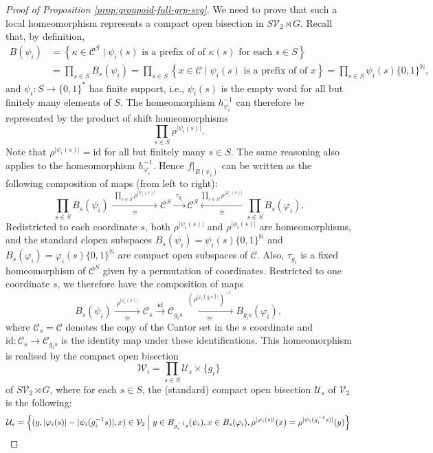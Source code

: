 \documentclass[10pt,a4paper]{amsart}
\numberwithin{equation}{section}
\numberwithin{figure}{section}
\theoremstyle{definition}
\newcommand{\cC}{\mathcal{C}}
\newcommand{\cU}{\mathcal{U}}
\newcommand{\cV}{\mathcal{V}}
\newcommand{\cW}{\mathcal{W}}
\newcommand{\bN}{\mathbb{N}}
\begin{document}
\begin{proof}[Proof of Proposition \ref{prop:groupoid-full-grp-svg}]
We need to prove that such a local homeomorphism represents a compact open bisection in $S\cV_2\rtimes G$. Recall that, by definition,
\begin{align*}
B(\psi_i) &= \left\lbrace \kappa \in \cC^S \mid \psi_i(s) \text{ is a prefix of of } \kappa(s) \text{ for each }s\in S \right\rbrace \\
&= \prod_{s \in S} B_s(\psi_i) = \prod_{s \in S} \left\lbrace x \in \cC \mid \psi_i(s) \text{ is a prefix of of } x \right\rbrace = \prod_{s \in S} \psi_i(s)\{0,1\}^\bN,
\end{align*}
and $\psi_i \colon S\to \{0,1\}^\ast$ has finite support, i.e., $\psi_i(s)$ is the empty word for all but finitely many elements of $S$. The homeomorphism $h_{\psi_i}^{-1}$ can therefore be represented by the product of shift homeomorphisms
\[
\prod_{s\in S} \rho^{\lvert \psi_i(s) \vert} .
\]
Note that $\rho^{\lvert \psi_i(s) \vert} = \mathrm{id}$ for all but finitely many $s\in S$. The same reasoning also applies to the homeomorphism $h^{-1}_{\varphi_i}$. Hence $f|_{B(\psi_i)}$ can be written as the following composition of maps (from left to right):
\[
\prod_{s \in S} B_s(\psi_i) \xrightarrow[\cong]{\; \prod_{s\in S} \rho^{\lvert \psi_i(s) \rvert} \;} \cC^S \xrightarrow[]{\; \tau_{g_i} \;}\cC^S \xleftarrow[\cong]{\prod_{s\in S} \rho^{\lvert \varphi_i(s) \rvert}} \prod_{s \in S} B_s(\varphi_i).
\]
Redistricted to each coordinate $s$, both $\rho^{\lvert \psi_i(s) \rvert}$ and $ \rho^{\lvert \phi_i(s) \rvert}$ are homeomorphisms, and the standard clopen subspaces $B_s(\psi_i) = \psi_i(s)\{0,1\}^\bN$ and $B_s(\varphi_i) = \varphi_i(s)\{0,1\}^\bN$ are compact open subspaces of $\cC$. Also, $\tau_{g_i}$ is a fixed homeomorphism of $\cC^S$ given by a permutation of coordinates. Restricted to one coordinate $s$, we therefore have the composition of maps
\[
B_s(\psi_i) \xrightarrow[\cong]{\; \rho^{\lvert \psi_i(s) \rvert} \;} \cC_s \xrightarrow[]{\; \mathrm{id} \;} \cC_{g_i s} \xrightarrow[\cong]{\; (\rho^{\lvert \varphi_i(g_i s) \rvert})^{-1} \;} B_{g_i s}(\varphi_i),
\]
where $\cC_s = \cC$ denotes the copy of the Cantor set in the $s$ coordinate and $\mathrm{id} \colon \cC_s \to \cC_{g_i s}$ is the identity map under these identifications. This homeomorphism is realised by the compact open bisection
\[
\cW_i = \prod_{s \in S} \cU_s \times \{g_i\}
\]
of $S\cV_2 \rtimes G$, where for each $s \in S$, the (standard) compact open bisection $\cU_s$ of $\cV_2$ is the following:
\begin{align*}
\cU_s &= \left\lbrace (y, \lvert \varphi_i(s) \rvert - \lvert \psi_i(g_i^{-1}s) \rvert ,x) \in \cV_2 \Bigm| y\in B_{g_i^{-1}s}(\psi_i), x\in B_{s}(\varphi_i), \rho^{\lvert \varphi_i(s) \rvert}(x) = \rho^{\lvert \psi_i(g_i^{-1}s) \rvert}(y) \right\rbrace \\

\end{align*}
\end{proof}
\end{document}

